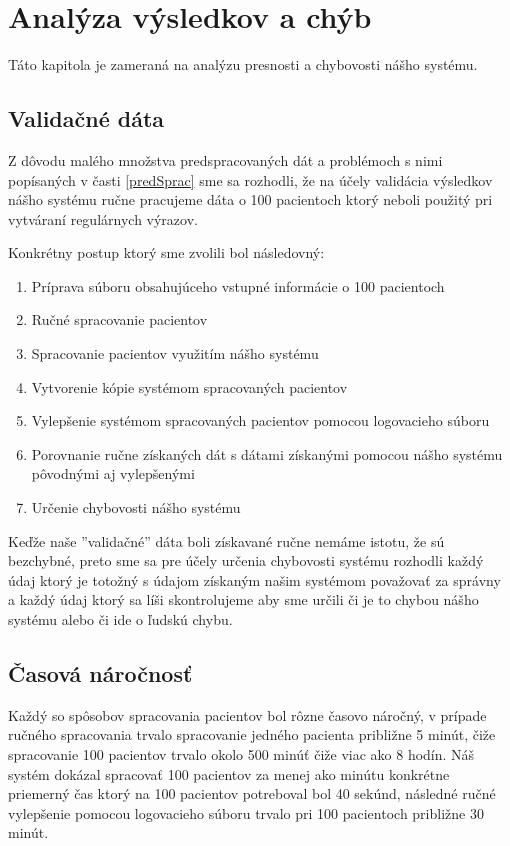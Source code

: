 \chapter{Analýza výsledkov a chýb}

Táto kapitola je zameraná na analýzu presnosti a chybovosti nášho systému.

\section{Validačné dáta}

Z dôvodu malého množstva predspracovaných dát a problémoch s nimi popísaných v časti \ref{predSprac} sme sa rozhodli, že na účely validácia výsledkov nášho systému ručne pracujeme dáta o 100 pacientoch ktorý neboli použitý pri vytváraní regulárnych výrazov.  

Konkrétny postup ktorý sme zvolili bol následovný:

\begin{enumerate}
	\item Príprava súboru obsahujúceho vstupné informácie o 100 pacientoch
	\item Ručné spracovanie pacientov
	\item Spracovanie pacientov využitím nášho systému
	\item Vytvorenie kópie systémom spracovaných pacientov
	\item Vylepšenie systémom spracovaných pacientov pomocou logovacieho súboru 
	\item Porovnanie ručne získaných dát s dátami získanými pomocou nášho systému pôvodnými aj vylepšenými
	\item Určenie chybovosti nášho systému   
\end{enumerate}

Keďže naše ''validačné'' dáta boli získavané ručne nemáme istotu, že sú bezchybné, preto sme sa pre účely určenia chybovosti systému rozhodli každý údaj ktorý je totožný s údajom získaným našim systémom považovať za správny a každý údaj ktorý sa líši skontrolujeme aby sme určili či je to chybou nášho systému alebo či ide o ľudskú chybu.

\section{Časová náročnosť}

Každý so spôsobov spracovania pacientov bol rôzne časovo náročný, v prípade ručného spracovania trvalo spracovanie jedného pacienta približne 5 minút, čiže spracovanie 100 pacientov trvalo okolo 500 minúť čiže viac ako 8 hodín. Náš systém dokázal spracovať 100 pacientov za menej ako minútu konkrétne priemerný čas ktorý na 100 pacientov potreboval bol 40 sekúnd, následné ručné vylepšenie pomocou logovacieho súboru trvalo pri 100 pacientoch približne 30 minút.


